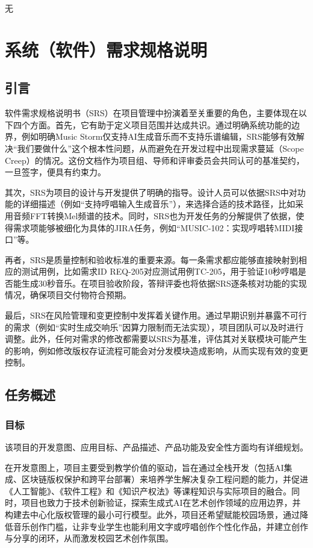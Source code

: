 \documentclass{base}
\numberwithin{figure}{section} %
\begin{document}
无
\newpage

\section{系统（软件）需求规格说明}

\subsection{引言}

软件需求规格说明书（SRS）在项目管理中扮演着至关重要的角色，主要体现在以下四个方面。首先，它有助于定义项目范围并达成共识。通过明确系统功能的边界，例如明确Music Storm仅支持AI生成音乐而不支持乐谱编辑，SRS能够有效解决“我们要做什么”这个根本性问题，从而避免在开发过程中出现需求蔓延（Scope Creep）的情况。这份文档作为项目组、导师和评审委员会共同认可的基准契约，一旦签字，便具有约束力。

其次，SRS为项目的设计与开发提供了明确的指导。设计人员可以依据SRS中对功能的详细描述（例如“支持哼唱输入生成音乐”），来选择合适的技术路径，比如采用音频FFT转换Mel频谱的技术。同时，SRS也为开发任务的分解提供了依据，使得需求项能够被细化为具体的JIRA任务，例如“MUSIC-102：实现哼唱转MIDI接口”等。

再者，SRS是质量控制和验收标准的重要来源。每一条需求都应能够直接映射到相应的测试用例，比如需求ID REQ-205对应测试用例TC-205，用于验证10秒哼唱是否能生成30秒音乐。在项目验收阶段，答辩评委也将依据SRS逐条核对功能的实现情况，确保项目交付物符合预期。

最后，SRS在风险管理和变更控制中发挥着关键作用。通过早期识别并暴露不可行的需求（例如“实时生成交响乐”因算力限制而无法实现），项目团队可以及时进行调整。此外，任何对需求的修改都需要以SRS为基准，评估其对关联模块可能产生的影响，例如修改版权存证流程可能会对分发模块造成影响，从而实现有效的变更控制。

\subsection{任务概述}
\subsubsection{目标}

该项目的开发意图、应用目标、产品描述、产品功能及安全性方面均有详细规划。

在开发意图上，项目主要受到教学价值的驱动，旨在通过全栈开发（包括AI集成、区块链版权保护和跨平台部署）来培养学生解决复杂工程问题的能力，并促进《人工智能》、《软件工程》和《知识产权法》等课程知识与实际项目的融合。同时，项目也致力于技术创新验证，探索生成式AI在艺术创作领域的应用边界，并构建去中心化版权管理的最小可行模型。此外，项目还希望赋能校园场景，通过降低音乐创作门槛，让非专业学生也能利用文字或哼唱创作个性化作品，并建立创作与分享的闭环，从而激发校园艺术创作氛围。
\end{document}
